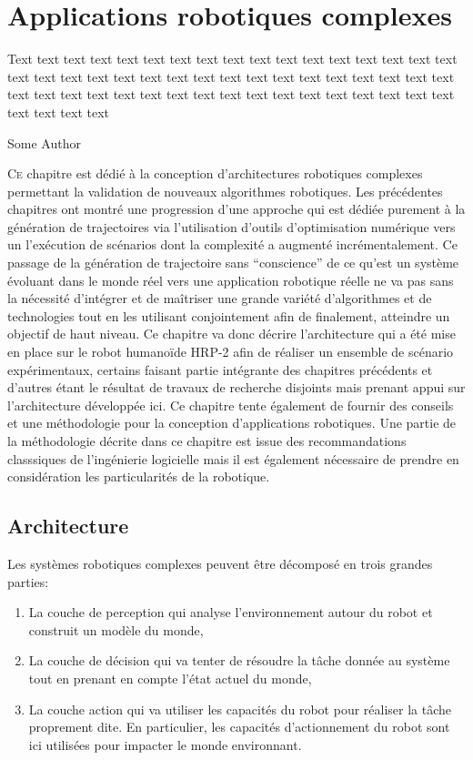 \chapter{Applications robotiques complexes}
\label{chap:integration}

\epigraph{Text text text text text text text text text text text text
  text text text text text text text text text text text text text
  text text text text text text text text text text text text text
  text text text text text text text text text text text text text
  text text text text}{Some Author}
\clearpage

\lettrine[lines=2, lraise=0.1, nindent=0em, slope=-.5em]%
{C}{e} chapitre est dédié à la conception d'architectures robotiques
complexes permettant la validation de nouveaux algorithmes robotiques.
Les précédentes chapitres ont montré une progression d'une approche
qui est dédiée purement à la génération de trajectoires via
l'utilisation d'outils d'optimisation numérique vers un l'exécution de
scénarios dont la complexité a augmenté incrémentalement. Ce passage
de la génération de trajectoire sans ``conscience'' de ce qu'est un
système évoluant dans le monde réel vers une application robotique
réelle ne va pas sans la nécessité d'intégrer et de maîtriser une
grande variété d'algorithmes et de technologies tout en les utilisant
conjointement afin de finalement, atteindre un objectif de haut
niveau. Ce chapitre va donc décrire l'architecture qui a été mise en
place sur le robot humanoïde HRP-2 afin de réaliser un ensemble de
scénario expérimentaux, certains faisant partie intégrante des
chapitres précédents et d'autres étant le résultat de travaux de
recherche disjoints mais prenant appui sur l'architecture développée
ici. Ce chapitre tente également de fournir des conseils et une
méthodologie pour la conception d'applications robotiques. Une partie
de la méthodologie décrite dans ce chapitre est issue des
recommandations classsiques de l'ingénierie logicielle mais il est
également nécessaire de prendre en considération les particularités de
la robotique.

\section{Architecture}


Les systèmes robotiques complexes peuvent être décomposé en trois
grandes parties:

\begin{enumerate}
\item La couche de perception qui analyse l'environnement autour du
  robot et construit un modèle du monde,
\item La couche de décision qui va tenter de résoudre la tâche donnée
  au système tout en prenant en compte l'état actuel du monde,
\item La couche action qui va utiliser les capacités du robot pour
  réaliser la tâche proprement dite. En particulier, les capacités
  d'actionnement du robot sont ici utilisées pour impacter le monde
  environnant.
\end{enumerate}


